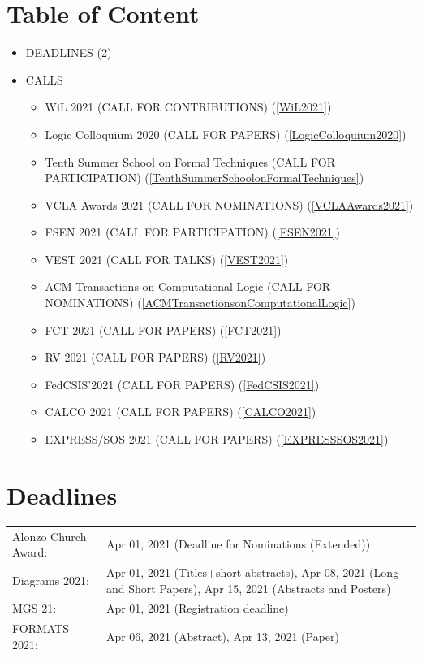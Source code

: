 \documentclass[prodmode,acmtecs]{acmsmall} %
\begin{document}
\section{Table of Content}\begin{itemize}\item DEADLINES (\cref{deadlines}) 
 
\item CALLS 
 
\begin{itemize}\item WiL 2021 (CALL FOR CONTRIBUTIONS) (\cref{WiL2021})
\item Logic Colloquium 2020 (CALL FOR PAPERS) (\cref{LogicColloquium2020})
\item Tenth Summer School on Formal Techniques (CALL FOR PARTICIPATION) (\cref{TenthSummerSchoolonFormalTechniques})
\item VCLA Awards 2021 (CALL FOR NOMINATIONS) (\cref{VCLAAwards2021})
\item FSEN 2021 (CALL FOR PARTICIPATION) (\cref{FSEN2021})
\item VEST 2021 (CALL FOR TALKS) (\cref{VEST2021})
\item ACM Transactions on Computational Logic (CALL FOR NOMINATIONS) (\cref{ACMTransactionsonComputationalLogic})
\item FCT 2021 (CALL FOR PAPERS) (\cref{FCT2021})
\item RV 2021 (CALL FOR PAPERS) (\cref{RV2021})
\item FedCSIS’2021 (CALL FOR PAPERS) (\cref{FedCSIS2021})
\item CALCO 2021 (CALL FOR PAPERS) (\cref{CALCO2021})
\item EXPRESS/SOS 2021 (CALL FOR PAPERS) (\cref{EXPRESSSOS2021})
\end{itemize} 
\end{itemize}\section{Deadlines}\label{deadlines}\begin{tabulary}{\linewidth}{LL}Alonzo Church Award:  & Apr 01, 2021 (Deadline for Nominations (Extended)) \\
Diagrams 2021:  & Apr 01, 2021 (Titles+short abstracts), Apr 08, 2021 (Long and Short Papers), Apr 15, 2021 (Abstracts and Posters) \\
MGS 21:  & Apr 01, 2021 (Registration deadline) \\
FORMATS 2021:  & Apr 06, 2021 (Abstract), Apr 13, 2021 (Paper) \\

\end{tabulary}
\end{document}
